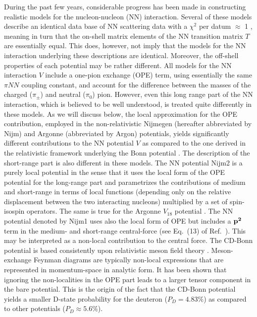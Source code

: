 During the past few years, considerable progress has been made in constructing
realistic models for the nucleon-nucleon (NN) interaction. Several of these 
models describe an
identical data base of NN scattering data with a $\chi^2$ per datum $\approx$ 1
\cite{nim,v18,cdbonn}, meaning in turn
that the on-shell matrix elements of the NN
transition matrix $T$ are essentially equal. This does, however, not imply
that the models for the NN interaction underlying these descriptions are
identical. Moreover, the off-shell properties of each potential
may be rather different. 
All models for the NN interaction $V$
include a one-pion exchange (OPE) term, using essentially 
the same $\pi NN$ coupling constant, and account for the difference between the
masses of the charged ($\pi_\pm$) and neutral ($\pi_0$) pion. 
However, even this
long range part of the NN interaction, which is believed to be well
understood, is treated quite differently in these models. As we will discuss
below, the local approximation for the OPE contribution, employed in the
non-relativistic 
Nijmegen \cite{nim} (hereafter abbreviated by Nijm) and Argonne \cite{v18} 
(abbreviated by Argon) potentials, yields
significantly different contributions to the NN potential $V$  as
compared to the one derived in the relativistic framework
underlying the Bonn potential
\cite{cdbonn}. The description of the short-range part is also different in
these models. 
The NN potential
Nijm2 \cite{nim} is a  purely local potential in the sense that 
it uses the
local form of the OPE potential for the long-range part and
parametrizes the contributions of medium and short-range in terms of local
functions (depending only on the relative displacement between the 
two interacting nucleons)
multiplied by a set of spin-isospin operators. 
The same is true for the
Argonne $V_{18}$ potential \cite{v18}. The NN potential denoted by Nijm1
\cite{nim} uses also the local form of OPE
but includes a $\bf p^2$ term in the
medium- and short-range 
central-force
(see Eq.\ (13) of Ref.\ \cite{nim}).  
This may be interpreted as a non-local contribution to the central
force.
The CD-Bonn
potential is based consistently upon relativistic meson field theory
\cite{rup}. Meson-exchange Feynman diagrams are typically non-local expressions
that are represented in momentum-space in analytic form.
It has been shown \cite{cdbonn} that  ignoring the non-localities in the 
OPE part leads 
to a larger tensor component in the bare potential.
This is the
origin of the fact that the CD-Bonn potential yields a smaller D-state
probability for the deuteron ($P_D = 4.83 \%$) as compared to
other potentials ($P_D \approx 5.6 \%$). 

